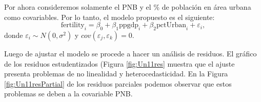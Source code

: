 \documentclass[
]{article}
\newenvironment{Shaded}{\begin{snugshade}}{\end{snugshade}}
\newcommand{\AttributeTok}[1]{\textcolor[rgb]{0.13,0.29,0.53}{#1}}
\newcommand{\DecValTok}[1]{\textcolor[rgb]{0.00,0.00,0.81}{#1}}
\newcommand{\FunctionTok}[1]{\textcolor[rgb]{0.13,0.29,0.53}{\textbf{#1}}}
\newcommand{\NormalTok}[1]{#1}
\newcommand{\OtherTok}[1]{\textcolor[rgb]{0.56,0.35,0.01}{#1}}
\newcommand{\SpecialCharTok}[1]{\textcolor[rgb]{0.81,0.36,0.00}{\textbf{#1}}}
\newcommand{\StringTok}[1]{\textcolor[rgb]{0.31,0.60,0.02}{#1}}
\begin{document}
Por ahora consideremos solamente el PNB y el \% de población en área urbana como covariables. Por lo tanto, el modelo propuesto es el siguiente:
\[
\mbox{fertility}_{i} = \beta_{0} + \beta_{1}\mbox{ppgdp}_{i} + \beta_{2}\mbox{pctUrban}_{i} + \varepsilon_{i},
\]
donde \(\varepsilon_{i}\sim N(0,\sigma^{2})\) y \(cov(\varepsilon_{j},\varepsilon_{k})=0\).

Luego de ajustar el modelo se procede a hacer un análisis de residuos. El gráfico de los residuos estudentizados (Figura \ref{fig:Un11res} muestra que el ajuste presenta problemas de no linealidad y heterocedasticidad. En la Figura \ref{fig:Un11resPartial} de los residuos parciales podemos observar que estos problemas se deben a la covariable PNB.

\begin{Shaded}
\end{Shaded}
\end{document}
